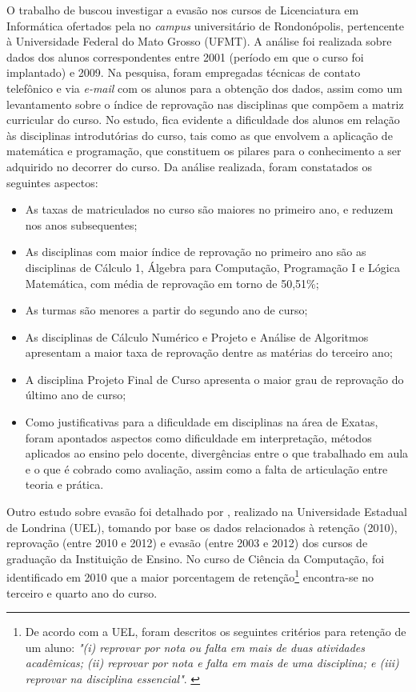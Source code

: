 O trabalho de \citet{prietch_pazeto2010} buscou investigar a evasão nos cursos de Licenciatura em Informática ofertados pela no \textit{campus} universitário de Rondonópolis, pertencente à Universidade Federal do Mato Grosso (UFMT). A análise foi realizada sobre dados dos alunos correspondentes entre 2001 (período em que o curso foi implantado) e 2009. Na pesquisa, foram empregadas técnicas de contato telefônico e via \textit{e-mail} com os alunos para a obtenção dos dados, assim como um levantamento sobre o índice de reprovação nas disciplinas que compõem a matriz curricular do curso. No estudo, fica evidente a dificuldade dos alunos em relação às disciplinas introdutórias do curso, tais como as que envolvem a aplicação de matemática e programação, que constituem os pilares para o conhecimento a ser adquirido no decorrer do curso. Da análise realizada, foram constatados os seguintes aspectos:

\begin{itemize}
\item As taxas de matriculados no curso são maiores no primeiro ano, e reduzem nos anos subsequentes;
\item As disciplinas com maior índice de reprovação no primeiro ano são as disciplinas de Cálculo 1, Álgebra para Computação, Programação I e Lógica Matemática, com média de reprovação em torno de 50,51\%;
\item As turmas são menores a partir do segundo ano de curso;
\item As disciplinas de Cálculo Numérico e Projeto e Análise de Algoritmos apresentam a maior taxa de reprovação dentre as matérias do terceiro ano;
\item A disciplina Projeto Final de Curso apresenta o maior grau de reprovação do último ano de curso;
\item Como justificativas para a dificuldade em disciplinas na área de Exatas, foram apontados aspectos como dificuldade em interpretação, métodos aplicados ao ensino pelo docente, divergências entre o que trabalhado em aula e o que é cobrado como avaliação, assim como a falta de articulação entre teoria e prática.
\end{itemize}

Outro estudo sobre evasão foi detalhado por \citet{rissi_marcondes2013}, realizado na Universidade Estadual de Londrina (UEL), tomando por base os dados relacionados à retenção (2010), reprovação (entre 2010 e 2012) e evasão (entre 2003 e 2012) dos cursos de graduação da Instituição de Ensino. No curso de Ciência da Computação, foi identificado em 2010 que a maior porcentagem de retenção\footnote{De acordo com a UEL, foram descritos os seguintes critérios para retenção de um aluno: \textit{"(i) reprovar por nota ou falta em mais de duas atividades acadêmicas; (ii) reprovar por nota e falta em mais de uma disciplina; e (iii) reprovar na disciplina essencial"}. \cite{rissi_marcondes2013}} encontra-se no terceiro e quarto ano do curso. 

